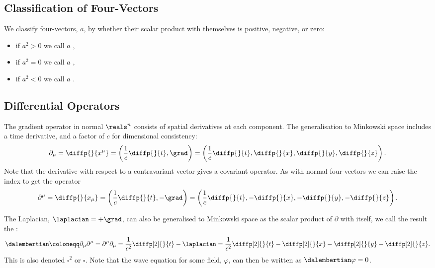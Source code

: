 \subsection{Classification of Four-Vectors}
We classify four-vectors, \(a\), by whether their scalar product with themselves is positive, negative, or zero:
\begin{itemize}
    \item if \(a^2 > 0\) we call \(a\) ,
    \item if \(a^2 = 0\) we call \(a\) ,
    \item if \(a^2 < 0\) we call \(a\) .
\end{itemize}

\subsection{Differential Operators}
The gradient operator in normal \(\reals^n\) consists of spatial derivatives at each component.
The generalisation to Minkowski space includes a time derivative, and a factor of \(c\) for dimensional consistency:\index{\(\partial_\mu\)}
\begin{equation}
    \partial_\mu = \diffp{}{x^\mu} = \left( \frac{1}{c}\diffp{}{t}, \grad \right) = \left( \frac{1}{c}\diffp{}{t}, \diffp{}{x}, \diffp{}{y}, \diffp{}{z} \right).
\end{equation}
Note that the derivative with respect to a contravariant vector gives a covariant operator.
As with normal four-vectors we can raise the index to get the operator
\begin{equation}
    \partial^\mu = \diffp{}{x_\mu} = \left( \frac{1}{c}\diffp{}{t}, -\grad \right) = \left( \frac{1}{c}\diffp{}{t}, -\diffp{}{x}, -\diffp{}{y}, -\diffp{}{z} \right).
\end{equation}

The Laplacian, \(\laplacian = \div \grad\), can also be generalised to Minkowski space as the scalar product of \(\partial\) with itself, we call the result the :
\begin{equation}
    \dalembertian \coloneqq \partial_\mu \partial^\mu = \partial^\mu \partial_\mu = \frac{1}{c^2}\diffp[2]{}{t} - \laplacian = \frac{1}{c^2} \diffp[2]{}{t} - \diffp[2]{}{x} - \diffp[2]{}{y} - \diffp[2]{}{z}.
\end{equation}
This is also denoted \(\square^2\) or \(\square\).
Note that the wave equation for some field, \(\varphi\), can then be written as \(\dalembertian\varphi = 0\).


